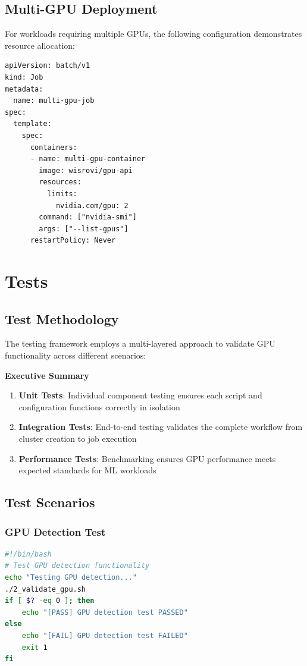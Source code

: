 \documentclass[12pt,a4paper]{report}
\begin{document}
\section{Multi-GPU Deployment}
For workloads requiring multiple GPUs, the following configuration demonstrates resource allocation:

\begin{lstlisting}[caption=Multi-GPU Job,label=lst:multi-gpu]
apiVersion: batch/v1
kind: Job
metadata:
  name: multi-gpu-job
spec:
  template:
    spec:
      containers:
      - name: multi-gpu-container
        image: wisrovi/gpu-api
        resources:
          limits:
            nvidia.com/gpu: 2
        command: ["nvidia-smi"]
        args: ["--list-gpus"]
      restartPolicy: Never
\end{lstlisting}

\chapter{Tests}
\label{chap:tests}

\section{Test Methodology}
The testing framework employs a multi-layered approach to validate GPU functionality across different scenarios:

\begin{center}
\textbf{Executive Summary}
\end{center}

\vspace{0.3cm}

\begin{enumerate}
    \item \textbf{Unit Tests}: Individual component testing ensures each script and configuration functions correctly in isolation
    \item \textbf{Integration Tests}: End-to-end testing validates the complete workflow from cluster creation to job execution
    \item \textbf{Performance Tests}: Benchmarking ensures GPU performance meets expected standards for ML workloads
\end{enumerate}

\section{Test Scenarios}

\subsection{GPU Detection Test}
\begin{lstlisting}[language=bash,caption=GPU Detection Test,label=lst:gpu-detection-test]
#!/bin/bash
# Test GPU detection functionality
echo "Testing GPU detection..."
./2_validate_gpu.sh
if [ $? -eq 0 ]; then
    echo "[PASS] GPU detection test PASSED"
else
    echo "[FAIL] GPU detection test FAILED"
    exit 1
fi
\end{lstlisting}
\end{document}
